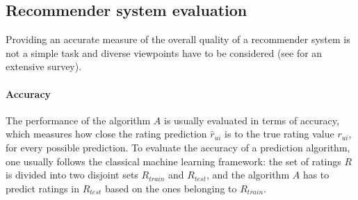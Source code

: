 \documentclass{llncs}
\begin{document}
%


\subsection{Recommender system
evaluation}\label{eval} Providing an accurate measure of the overall quality of
a recommender system is not a simple task and diverse viewpoints have to be
considered (see \cite{handbookRecoSys2011} for an extensive survey). 



\paragraph{Accuracy\\}
The performance of the algorithm $A$ is usually evaluated in terms of accuracy,
which measures how close the rating prediction $\hat{r}_{ui}$ is to the true
rating value $r_{ui}$, for every possible prediction. To evaluate the accuracy
of a prediction algorithm, one usually follows the classical machine learning
framework: the set of ratings $R$ is divided into two disjoint sets $R_{train}$
and $R_{test}$, and the algorithm $A$ has to predict ratings in $R_{test}$
based on the ones belonging to $R_{train}$.
\end{document}
